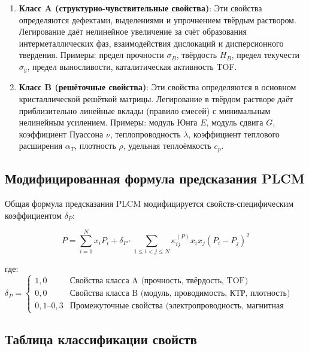 \documentclass[12pt,a4paper]{article}
\begin{document}
	\begin{enumerate}
		\item \textbf{Класс A (структурно-чувствительные свойства)}: Эти свойства определяются дефектами, выделениями и упрочнением твёрдым раствором. Легирование даёт нелинейное увеличение за счёт образования интерметаллических фаз, взаимодействия дислокаций и дисперсионного твердения. Примеры: предел прочности \(\sigma_B\), твёрдость \(H_B\), предел текучести \(\sigma_y\), предел выносливости, каталитическая активность TOF.
		
		\item \textbf{Класс B (решёточные свойства)}: Эти свойства определяются в основном кристаллической решёткой матрицы. Легирование в твёрдом растворе даёт приблизительно линейные вклады (правило смесей) с минимальным нелинейным усилением. Примеры: модуль Юнга \(E\), модуль сдвига \(G\), коэффициент Пуассона \(\nu\), теплопроводность \(\lambda\), коэффициент теплового расширения \(\alpha_T\), плотность \(\rho\), удельная теплоёмкость \(c_p\).
	\end{enumerate}
	
	\subsection{Модифицированная формула предсказания PLCM}
	
	Общая формула предсказания PLCM модифицируется свойств-специфическим коэффициентом \(\delta_P\):
	
	\begin{equation}
		\boxed{P = \sum_{i=1}^{N} x_i P_i + \delta_P \cdot \sum_{1\le i<j\le N} \kappa_{ij}^{(P)} x_i x_j (P_i - P_j)^2}
		\label{eq:plcm-modified}
	\end{equation}
	
	где:
	\[
	\delta_P = \begin{cases}
		1,0 & \text{Свойства класса A (прочность, твёрдость, TOF)} \\
		0,0 & \text{Свойства класса B (модуль, проводимость, КТР, плотность)} \\
		0,1\text{--}0,3 & \text{Промежуточные свойства (электропроводность, магнитная восприимчивость)}
	\end{cases}
	\]
	
	\subsection{Таблица классификации свойств}
	
\end{document}
